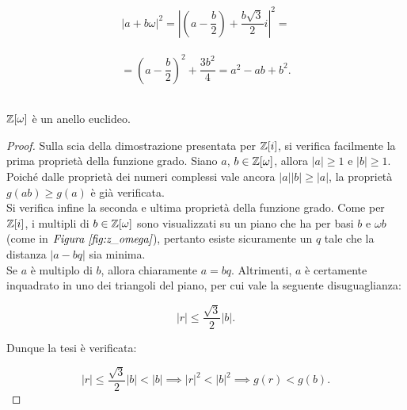 \[ \left|a+b\omega\right|^2 = \left|\left(a-\frac{b}{2}\right) + \frac{b\sqrt{3}}{2}i\right|^2 =\] \\

\[= \left(a-\frac{b}{2}\right)^2 + \frac{3b^2}{4} = a^2 - ab + b^2.\] \\

\begin{theorem}
    $\mathbb Z[\omega]$ è un anello euclideo.
\end{theorem}

\begin{proof}
    Sulla scia della dimostrazione presentata per $\mathbb Z[i]$, si verifica facilmente
    la prima proprietà della funzione grado. Siano $a$, $b \in \mathbb Z[\omega]$, allora
    $\left|a\right| \geq 1$ e $\left|b\right| \geq 1$. Poiché dalle proprietà
    dei numeri complessi vale ancora $\left|a\right| \left|b\right| \geq \left|a\right|$,
    la proprietà $g(ab) \geq g(a)$ è già verificata. \\

    Si verifica infine la seconda e ultima proprietà della funzione grado. Come per
    $\mathbb Z[i]$, i multipli di $b \in \mathbb Z[\omega]$ sono visualizzati su un piano che
    ha per basi $b$ e $\omega b$ (come in $\textit{Figura \ref{fig:z_omega}}$), pertanto
    esiste sicuramente un $q$ tale che la distanza $\left|a-bq\right|$ sia minima. \\

    Se $a$ è multiplo di $b$, allora chiaramente $a = bq$. Altrimenti, $a$ è certamente
    inquadrato in uno dei triangoli del piano, per cui vale la seguente disuguaglianza:

    \[\left|r\right| \leq \frac{\sqrt{3}}{2} \left|b\right|.\]

    Dunque la tesi è verificata:

    \[\left|r\right| \leq \frac{\sqrt{3}}{2} \left|b\right| < \left|b\right| \implies \left|r\right|^2 < \left|b\right|^2 \implies g(r) < g(b). \]
\end{proof}
